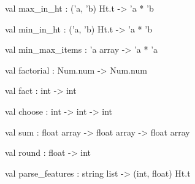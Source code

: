 \documentclass[11pt]{article}
\begin{document}
\label{val:Util.max-underscorein-underscoreht}\begin{ocamldoccode}
val max_in_ht : ('a, 'b) Ht.t -> 'a * 'b
\end{ocamldoccode}




\label{val:Util.min-underscorein-underscoreht}\begin{ocamldoccode}
val min_in_ht : ('a, 'b) Ht.t -> 'a * 'b
\end{ocamldoccode}




\label{val:Util.min-underscoremax-underscoreitems}\begin{ocamldoccode}
val min_max_items : 'a array -> 'a * 'a
\end{ocamldoccode}




\label{val:Util.factorial}\begin{ocamldoccode}
val factorial : Num.num -> Num.num
\end{ocamldoccode}




\label{val:Util.fact}\begin{ocamldoccode}
val fact : int -> int
\end{ocamldoccode}




\label{val:Util.choose}\begin{ocamldoccode}
val choose : int -> int -> int
\end{ocamldoccode}




\label{val:Util.sum}\begin{ocamldoccode}
val sum : float array -> float array -> float array
\end{ocamldoccode}




\label{val:Util.round}\begin{ocamldoccode}
val round : float -> int
\end{ocamldoccode}




\label{val:Util.parse-underscorefeatures}\begin{ocamldoccode}
val parse_features : string list -> (int, float) Ht.t
\end{ocamldoccode}
\end{document}
